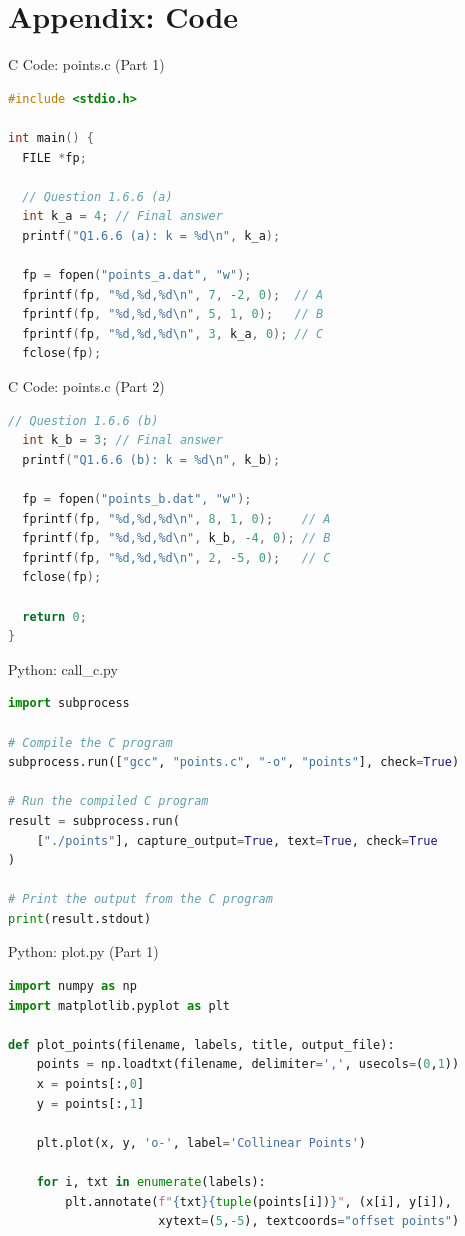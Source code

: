 \documentclass{beamer}
\numberwithin{equation}{section}
\theoremstyle{remark}
\begin{document}
\section*{Appendix: Code}

\begin{frame}[fragile]{C Code: points.c (Part 1)}
\begin{lstlisting}[language=C]
#include <stdio.h>

int main() {
  FILE *fp;

  // Question 1.6.6 (a)
  int k_a = 4; // Final answer
  printf("Q1.6.6 (a): k = %d\n", k_a);

  fp = fopen("points_a.dat", "w");
  fprintf(fp, "%d,%d,%d\n", 7, -2, 0);  // A
  fprintf(fp, "%d,%d,%d\n", 5, 1, 0);   // B
  fprintf(fp, "%d,%d,%d\n", 3, k_a, 0); // C
  fclose(fp);
\end{lstlisting}
\end{frame}

\begin{frame}[fragile]{C Code: points.c (Part 2)}
\begin{lstlisting}[language=C]
  // Question 1.6.6 (b)
  int k_b = 3; // Final answer
  printf("Q1.6.6 (b): k = %d\n", k_b);

  fp = fopen("points_b.dat", "w");
  fprintf(fp, "%d,%d,%d\n", 8, 1, 0);    // A
  fprintf(fp, "%d,%d,%d\n", k_b, -4, 0); // B
  fprintf(fp, "%d,%d,%d\n", 2, -5, 0);   // C
  fclose(fp);

  return 0;
}
\end{lstlisting}
\end{frame}

\begin{frame}[fragile]{Python: call\_c.py}
\begin{lstlisting}[language=Python]
import subprocess

# Compile the C program
subprocess.run(["gcc", "points.c", "-o", "points"], check=True)

# Run the compiled C program
result = subprocess.run(
    ["./points"], capture_output=True, text=True, check=True
)

# Print the output from the C program
print(result.stdout)
\end{lstlisting}
\end{frame}

\begin{frame}[fragile]{Python: plot.py (Part 1)}
\begin{lstlisting}[language=Python]
import numpy as np
import matplotlib.pyplot as plt

def plot_points(filename, labels, title, output_file):
    points = np.loadtxt(filename, delimiter=',', usecols=(0,1))
    x = points[:,0]
    y = points[:,1]

    plt.plot(x, y, 'o-', label='Collinear Points')

    for i, txt in enumerate(labels):
        plt.annotate(f"{txt}{tuple(points[i])}", (x[i], y[i]),
                     xytext=(5,-5), textcoords="offset points")
\end{lstlisting}
\end{frame}
\end{document}
